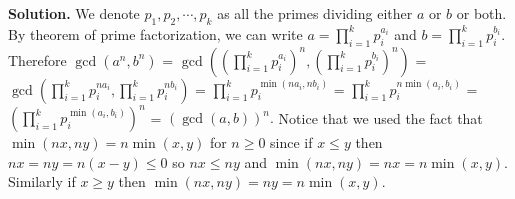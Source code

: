 \documentclass[11pt]{article}
\begin{document}
\begin{enumerate}
\textbf{Solution.} We denote $p_1, p_2,\cdots ,p_k$ as all the primes dividing either $a$ or $b$ or both. By theorem of prime factorization, we can write $a=\displaystyle\prod_{i=1}^{k} p_i^{a_i}$ and $b=\displaystyle\prod_{i=1}^{k} p_i^{b_i}$. Therefore $\gcd (a^n, b^n)$ 
= $\gcd \left(\left(\displaystyle\prod_{i=1}^{k} p_i^{a_i}\right)^n, \left(\displaystyle\prod_{i=1}^{k} p_i^{b_i}\right)^n\right)$
= $\gcd \left(\displaystyle\prod_{i=1}^{k} p_i^{na_i}, \displaystyle\prod_{i=1}^{k} p_i^{nb_i}\right)$
= $\displaystyle\prod_{i=1}^{k} p_i^{\min (na_i, nb_i)}$
= $\displaystyle\prod_{i=1}^{k} p_i^{n\min (a_i, b_i)}$
= $\left(\displaystyle\prod_{i=1}^{k} p_i^{\min (a_i, b_i)}\right)^n$
= $(\gcd (a,b))^n.$ 
Notice that we used the fact that $\min (nx, ny)=n\min (x,y)$ for $n\ge 0$ since if $x\le y$ then $nx=ny=n(x-y)\le 0$ so $nx\le ny$ and $\min (nx, ny)=nx=n\min (x,y)$. Similarly if $x\ge y$ then $\min (nx, ny)=ny=n\min (x,y)$.
\end{enumerate}
\end{document}
